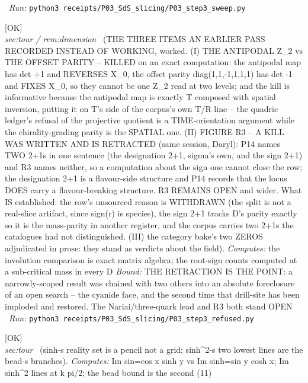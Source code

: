 \begin{description}
\ \emph{Run:} \texttt{python3 receipts/P03\_SdS\_slicing/P03\_step3\_sweep.py}
\item[\rcptlabel{P03_step3_refused}{P3R58}\textbf{P3R58}\quad\texttt{P03\_step3\_refused}]\hfill\textsf{[OK]}\\
\textit{sec:tour / rem:dimension} \ (THE THREE ITEMS AN EARLIER PASS RECORDED INSTEAD OF WORKING, worked. (I) THE ANTIPODAL Z\_2 vs THE OFFSET PARITY -- KILLED on an exact computation: the antipodal map has det +1 and REVERSES X\_0, the offset parity diag(1,1,-1,1,1,1) has det -1 and FIXES X\_0, so they cannot be one Z\_2 read at two levels; and the kill is informative because the antipodal map is exactly T composed with spatial inversion, putting it on T's side of the corpus's own T/R line -- the quadric ledger's refusal of the projective quotient is a TIME-orientation argument while the chirality-grading parity is the SPATIAL one. (II) FIGURE R3 -- A KILL WAS WRITTEN AND IS RETRACTED (same session, Daryl): P14 names TWO 2+1s in one sentence (the designation 2+1, sigma's own, and the sign 2+1) and R3 names neither, so a computation about the sign one cannot close the row; the designation 2+1 is a flavour-side structure and P14 records that the locus DOES carry a flavour-breaking structure. R3 REMAINS OPEN and wider. What IS established: the row's unsourced reason is WITHDRAWN (the split is not a real-slice artifact, since sign(r) is species), the sign 2+1 tracks D's parity exactly so it is the mass-parity in another register, and the corpus carries two 2+1s the catalogues had not distinguished. (III) the category bake's two ZEROS adjudicated in prose: they stand as verdicts about the field). 
\emph{Computes:} the involution comparison is exact matrix algebra; the root-sign counts computed at a sub-critical mass in every D
 \emph{Bound:} THE RETRACTION IS THE POINT: a narrowly-scoped result was chained with two others into an absolute foreclosure of an open search -- the cyanide face, and the second time that drill-site has been imploded and restored. The Nariai/three-quark lead and R3 both stand OPEN
\ \emph{Run:} \texttt{python3 receipts/P03\_SdS\_slicing/P03\_step3\_refused.py}
\item[\label{rcpt:C4_the_reality_grid_and_the_pencil}\textbf{}\quad\texttt{C4\_the\_reality\_grid\_and\_the\_pencil}]\hfill\textsf{[OK]}\\
\textit{sec:tour} \ (sinh-s reality set is a pencil not a grid; sinh\textasciicircum{}2-s two lowest lines are the bead-s branches). 
\emph{Computes:} Im sin=cos x sinh y vs Im sinh=sin y cosh x; Im sinh\textasciicircum{}2 lines at k pi/2; the bead bound is the second (11)

\end{description}
